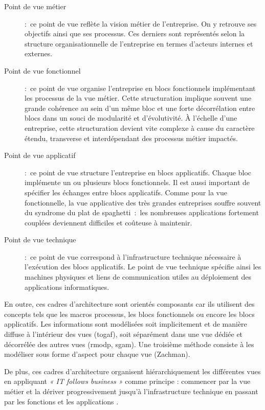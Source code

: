 \begin{description}

    \item[Point de vue métier]:~ce point de vue reflète la vision métier de
    l'entreprise. On y retrouve ses objectifs ainsi que ses processus. Ces
    derniers sont représentés selon la structure organisationnelle de
    l'entreprise en termes d'acteurs internes et externes.

    \item[Point de vue fonctionnel]:~ce point de vue organise l'entreprise en
    blocs fonctionnels implémentant les processus de la vue métier. Cette
    structuration implique souvent une grande cohérence au sein d'un même bloc
    et une forte décorrélation entre blocs dans un souci de modularité et
    d'évolutivité. À l'échelle d'une entreprise, cette structuration devient
    vite complexe à cause du caractère étendu, transverse et interdépendant des
    processus métier impactés.

    \item[Point de vue applicatif]:~ce point de vue structure l'entreprise en
    blocs applicatifs. Chaque bloc implémente un ou plusieurs blocs
    fonctionnels. Il est aussi important de spécifier les échanges entre blocs
    applicatifs. Comme pour la vue fonctionnelle, la vue applicative des très
    grandes entreprises souffre souvent du syndrome du plat de spaghetti~:~les
    nombreuses applications fortement couplées deviennent difficiles et
    coûteuse à maintenir.

    \item[Point de vue technique]:~ce point de vue correspond à
    l'infrastructure technique nécessaire à l'exécution des blocs applicatifs.
    Le point de vue technique spécifie ainsi les machines physiques et liens de
    communication utiles au déploiement des applications informatiques. 

\end{description}

En outre, ces cadres d'architecture sont orientés composants car ils utilisent
des concepts tels que les macros processus, les blocs fonctionnels ou encore
les blocs applicatifs. Les informations sont modélisées soit implicitement et
de manière diffuse à l'intérieur des vues (\gls{togaf}), soit séparément dans une vue
dédiée et décorrélée des autres vues (\gls{rmodp}, \gls{sgam}). Une troisième
méthode consiste à les modéliser sous forme d'aspect pour chaque vue (Zachman).

De plus, ces cadres d'architecture organisent hiérarchiquement les différentes vues en
appliquant \emph{« IT follows business »} comme principe : commencer par la
vue métier et la dériver progressivement jusqu'à l'infrastructure
technique en passant par les fonctions et les applications
\cite{winter2006essential}. 

